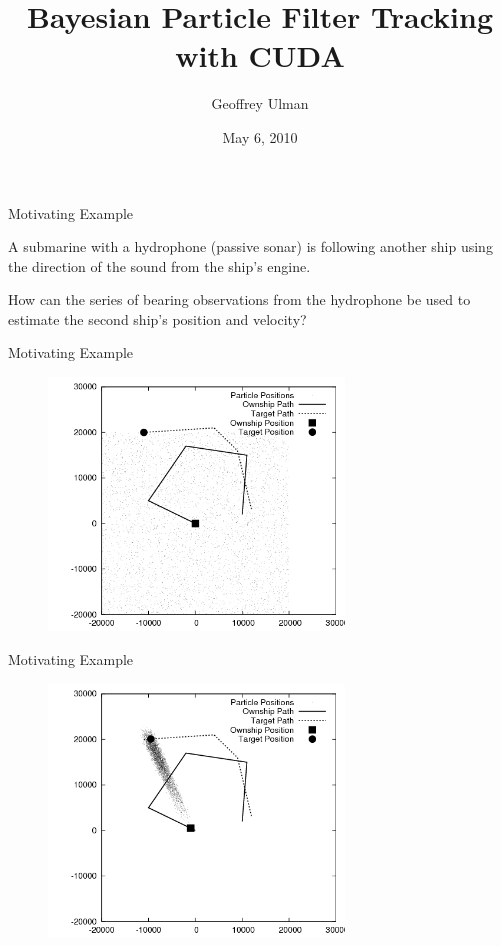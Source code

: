 \documentclass{beamer}
\title{Bayesian Particle Filter Tracking with CUDA}
\author{Geoffrey Ulman}
\date{May 6, 2010}
\begin{document}

\begin{frame}
\titlepage
\end{frame}


\begin{frame}{Motivating Example}

A submarine with a hydrophone (passive sonar) is following another
ship using the direction of the sound from the ship's engine.

\vspace{1cm}

How can the series of bearing observations from the hydrophone be
used to estimate the second ship's position and velocity?

\end{frame}


\begin{frame}{Motivating Example}
\begin{figure}
\centering
\includegraphics[width=0.7\textwidth]{data/azimuth_only_0.png}
\end{figure}
\end{frame}


\begin{frame}{Motivating Example}
\begin{figure}
\centering
\includegraphics[width=0.7\textwidth]{data/azimuth_only_100.png}
\end{figure}
\end{frame}
\end{document}
